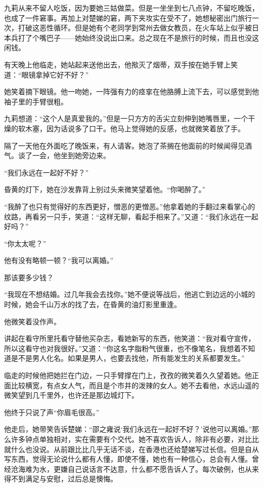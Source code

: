 \par 九莉从来不留人吃饭，因为要她三姑做菜。但是一坐坐到七八点钟，不留吃晚饭，也成了一件窘事。再加上对楚娣的窘，两下夹攻实在受不了，她想秘密出门旅行一次，打破这恶性循环。但是她有个老同学到常州去做女教员，在火车站上似乎被日本兵打了个嘴巴子——她始终没说出口来。总之现在不是旅行的时候，而且也没这闲钱。
\par 有天晚上他临走，她站起来送他出去，他揿灭了烟蒂，双手按在她手臂上笑道：“眼镜拿掉它好不好？”
\par 她笑着摘下眼镜。他一吻她，一阵强有力的痉挛在他胳膊上流下去，可以感觉到他袖子里的手臂很粗。
\par 九莉想道：“这个人是真爱我的。”但是一只方方的舌尖立刻伸到她嘴唇里，一个干燥的软木塞，因为话说多了口干。他马上觉得她的反感，也就微笑着放了手。
\par 隔了一天他在外面吃了晚饭来，有人请客。她泡了茶搁在他面前的时候闻得见酒气。谈了一会，他坐到她旁边来。
\par “我们永远在一起好不好？”
\par 昏黄的灯下，她在沙发靠背上别过头来微笑望着他。“你喝醉了。”
\par “我醉了也只有觉得好的东西更好，憎恶的更憎恶。”他拿着她的手翻过来看掌心的纹路，再看另一只手，笑道：“这样无聊，看起手相来了。”又道：“我们永远在一起好吗？”
\par “你太太呢？”
\par 他有没有略顿一顿？“我可以离婚。”
\par 那该要多少钱？
\par “我现在不想结婚。过几年我会去找你。”她不便说等战后，他逃亡到边远的小城的时候，她会千山万水的找了去，在昏黄的油灯影里重逢。
\par 他微笑着没作声。
\par 讲起在看守所里托看守替他买杂志，看她新写的东西，他笑道：“我对看守宣传，所以这看守也对我很好。”又道：“你这名字脂粉气很重，也不像笔名，我想着不知道是不是男人化名。如果是男人，也要去找他，所有能发生的关系都要发生。”
\par 临走的时候他把她拦在门边，一只手臂撑在门上，孜孜的微笑着久久望着她。他正面比较横宽，有点女人气，而且是个市井的泼辣的女人。她不去看他，水远山遥的微笑望到几千里外，也许还是那边城灯下。
\par 他终于只说了声“你眉毛很高。”
\par 他走后，她带笑告诉楚娣：“邵之雍说‘我们永远在一起好不好？’说他可以离婚。”那么许多钟点单独相对，实在需要有个交代。她不喜欢告诉人，除非有必要，对比比就什么也没说。从前跟比比几乎无话不谈，在香港也还给楚娣写过长信。但是自从写东西，觉得无论说什么都有人懂，即使不懂，她也有一种信心，总会有人懂。曾经沧海难为水，更嫌自己说话言不达意，什么都不愿告诉人了。每次破例，也从来得不到满足与安慰，过后总是懊悔。
